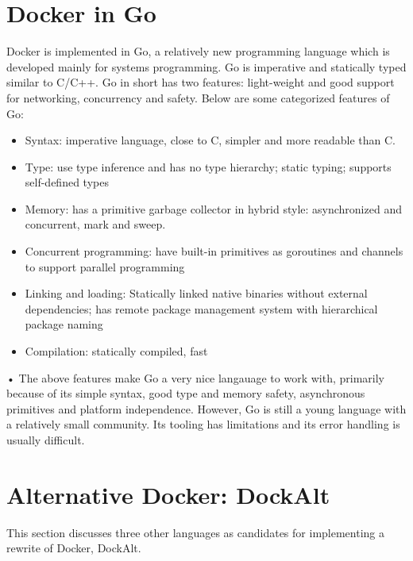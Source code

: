 \documentclass[letterpaper,twocolumn,10pt]{article}
\begin{document}
\section{Docker in Go}
 Docker is implemented in Go, a relatively new programming language which is developed mainly for systems programming. Go is imperative and statically typed similar to C/C++. Go in short has two features: light-weight and good support for networking, concurrency and safety. Below are some categorized features of Go:
\begin{itemize}
\item Syntax: imperative language, close to C, simpler and more readable than C. 
\item Type: use type inference and has no type hierarchy; static typing; supports self-defined types
\item Memory: has a primitive garbage collector in hybrid style: asynchronized and concurrent, mark and sweep.
\item Concurrent programming: have built-in primitives as goroutines and channels to support parallel programming
\item Linking and loading: Statically linked native binaries without external dependencies; has remote package management system with hierarchical package naming
\item Compilation: statically compiled, fast 
\end{itemize}•
The above features make Go a very nice langauage to work with, primarily because of its simple syntax, good type and memory safety, asynchronous primitives and platform independence. However, Go is still a young language with a relatively small community. Its tooling has limitations and its error handling is usually difficult.


\section{Alternative Docker: DockAlt}
This section discusses three other languages as candidates for implementing a rewrite of Docker, DockAlt.
\end{document}
